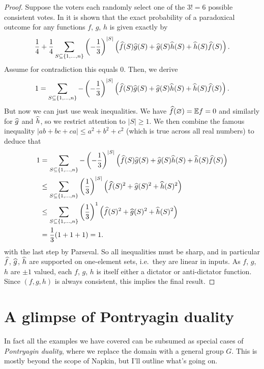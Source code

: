 \begin{proof}
	Suppose the voters each randomly select one of the $3!=6$
	possible consistent votes.
	In  it is shown
	that the exact probability of a paradoxical outcome
	for any functions $f$, $g$, $h$ is given exactly by
	\[ \frac14 + \frac14 \sum_{S \subseteq \{1, \dots, n\}}
		\left( -\frac13 \right)^{\left\lvert S \right\rvert} 
		\left( \widehat f(S) \widehat g(S) + \widehat g(S) \widehat h(S) + \widehat h(S) \widehat f(S) \right).
		\]
	Assume for contradiction this equals $0$.
	Then, we derive
	\[ 1 = \sum_{S \subseteq \{1, \dots, n\}}
		-\left( -\frac13 \right)^{\left\lvert S \right\rvert} 
		\left( \widehat f(S) \widehat g(S) + \widehat g(S) \widehat h(S) + \widehat h(S) \widehat f(S) \right). \]
	But now we can just use weak inequalities.
	We have $\widehat f(\varnothing) = \mathbb E f = 0$ and similarly for $\widehat g$ and $\widehat h$,
	so we restrict attention to $|S| \ge 1$.
	We then combine the famous inequality $|ab+bc+ca| \le a^2+b^2+c^2$
	(which is true across all real numbers) to deduce that
	\begin{align*}
		1 &= \sum_{S \subseteq \{1, \dots, n\}}
		-\left( -\frac13 \right)^{\left\lvert S \right\rvert} 
		\left( \widehat f(S) \widehat g(S) + \widehat g(S) \widehat h(S) + \widehat h(S) \widehat f(S) \right) \\
		&\le \sum_{S \subseteq \{1, \dots, n\}}
		\left( \frac13 \right)^{\left\lvert S \right\rvert} 
		\left( \widehat f(S)^2 + \widehat g(S)^2 + \widehat h(S)^2 \right) \\
		&\le \sum_{S \subseteq \{1, \dots, n\}} \left( \frac13 \right)^1
		\left( \widehat f(S)^2 + \widehat g(S)^2 + \widehat h(S)^2 \right) \\
		&= \frac13 (1+1+1) = 1.
	\end{align*}
	with the last step by Parseval.
	So all inequalities must be sharp, and in particular $\widehat f$, $\widehat g$, $\widehat h$
	are supported on one-element sets, i.e.\ they are linear in inputs.
	As $f$, $g$, $h$ are $\pm 1$ valued, each $f$, $g$, $h$ is itself
	either a dictator or anti-dictator function.
	Since $(f,g,h)$ is always consistent, this implies the final result.
\end{proof}


\section{A glimpse of Pontryagin duality}
In fact all the examples we have covered can be subsumed
as special cases of \emph{Pontryagin duality},
where we replace the domain with a general group $G$.
This is mostly beyond the scope of Napkin,
but I'll outline what's going on.

